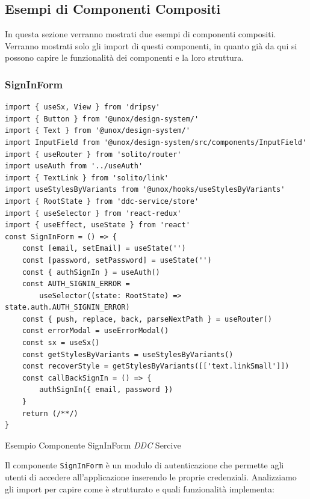 \subsection{Esempi di Componenti Compositi}

In questa sezione verranno mostrati due esempi di componenti compositi.
Verranno mostrati solo gli import di questi componenti, in quanto già da qui si possono capire le funzionalità dei componenti e la loro struttura.

\subsubsection{SignInForm}

\begin{listing}[H]
    \begin{verbatim} 
import { useSx, View } from 'dripsy'
import { Button } from '@unox/design-system/'
import { Text } from '@unox/design-system/'
import InputField from '@unox/design-system/src/components/InputField'
import { useRouter } from 'solito/router'
import useAuth from '../useAuth'
import { TextLink } from 'solito/link'
import useStylesByVariants from '@unox/hooks/useStylesByVariants'
import { RootState } from 'ddc-service/store'
import { useSelector } from 'react-redux'
import { useEffect, useState } from 'react'
const SignInForm = () => {
    const [email, setEmail] = useState('')
    const [password, setPassword] = useState('')
    const { authSignIn } = useAuth()
    const AUTH_SIGNIN_ERROR = 
        useSelector((state: RootState) => state.auth.AUTH_SIGNIN_ERROR)
    const { push, replace, back, parseNextPath } = useRouter()
    const errorModal = useErrorModal()
    const sx = useSx()
    const getStylesByVariants = useStylesByVariants()
    const recoverStyle = getStylesByVariants([['text.linkSmall']])
    const callBackSignIn = () => {
        authSignIn({ email, password })
    }
    return (/**/)
}
    \end{verbatim}
    \caption{Esempio Componente SignInForm \textit{DDC} Sercive}
    \label{listing_signinform_ddcservice}
\end{listing}


Il componente \texttt{SignInForm} è un modulo di autenticazione che permette agli utenti di accedere all'applicazione inserendo le proprie credenziali.
Analizziamo gli import per capire come è strutturato e quali funzionalità implementa:

